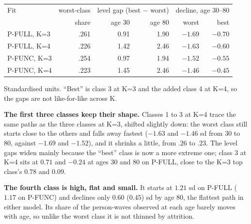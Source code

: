 \documentclass[11pt]{article}
\begin{document}
\begin{center}\small
\begin{tabular}{lrrrrr}
\toprule
Fit & worst-class & \multicolumn{2}{c}{level gap (best $-$ worst)} &
\multicolumn{2}{c}{decline, age 30--80} \\
 & share & age 30 & age 80 & worst & best \\
\midrule
P-FULL, K=3 & .261 & 0.91 & 1.90 & $-1.69$ & $-0.70$ \\
P-FULL, K=4 & .226 & 1.42 & 2.46 & $-1.63$ & $-0.60$ \\
\addlinespace
P-FUNC, K=3 & .254 & 0.97 & 1.94 & $-1.52$ & $-0.55$ \\
P-FUNC, K=4 & .223 & 1.45 & 2.46 & $-1.46$ & $-0.45$ \\
\bottomrule
\end{tabular}

{\scriptsize Standardised units. ``Best'' is class 3 at K=3 and the added
class 4 at K=4, so the gaps are not like-for-like across K.}
\end{center}

\textbf{The first three classes keep their shape.} Classes 1 to 3 at K=4
trace the same paths as the three classes at K=3, shifted slightly down:
the worst class still starts close to the others and falls away fastest
($-1.63$ and $-1.46$ sd from 30 to 80, against $-1.69$ and $-1.52$), and it
shrinks a little, from $.26$ to $.23$. The level gaps widen mainly because the
``best'' class is now a more extreme one; class 3 at K=4 sits at $0.71$ and
$-0.24$ at ages 30 and 80 on P-FULL, close to the K=3 top class's $0.78$ and
$0.09$.

\textbf{The fourth class is high, flat and small.} It starts at $1.21$ sd on
P-FULL ($1.17$ on P-FUNC) and declines only $0.60$ ($0.45$) sd by age 80, the
flattest path in either model. Its share of the person-waves observed at each
age barely moves with age, so unlike the worst class it is not thinned by
attrition.
\end{document}
